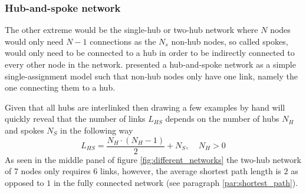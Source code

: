 \subsubsection{Hub-and-spoke network}
The other extreme would be the single-hub or two-hub network where $N$ nodes would only need $N-1$ connections as the $N_s$ non-hub nodes, so called spokes, would only need to be connected to a hub in order to be indirectly connected to every other node in the network. \citet{o1987quadratic} presented a hub-and-spoke network as a simple single-assignment model such that non-hub nodes only have one link, namely the one connecting them to a hub.
\par
Given that all hubs are interlinked then drawing a few examples by hand will quickly reveal that the number of links $L_{HS}$ depends on the number of hubs $N_H$ and spokes $N_S$ in the following way
\begin{equation*}
  L_{HS}=\frac{N_H\cdot(N_H-1)}{2}+N_S,\ \ \ \ \ N_H>0
\end{equation*}
As seen in the middle panel of figure \ref{fig:different_networks} the two-hub network of 7 nodes only requires 6 links, however, the average shortest path length is $2$ as opposed to $1$ in the fully connected network (see paragraph \ref{par:shortest_path}).

